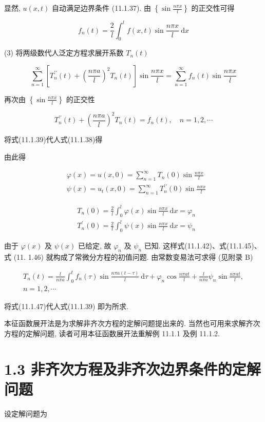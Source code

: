 显然, $u(x, t)$ 自动满足边界条件 (11.1.37). 由 $\left\{\sin \frac{n \pi x}{l}\right\}$ 的正交性可得

$$
f_{n}(t)=\frac{2}{l} \int_{0}^{l} f(x, t) \sin \frac{n \pi x}{l} \mathrm{~d} x
$$

(3) 将两级数代人泛定方程求展开系数 $T_{n}(t)$

$$
\sum_{n=1}^{\infty}\left[T_{n}^{\prime \prime}(t)+\left(\frac{n \pi a}{l}\right)^{2} T_{n}(t)\right] \sin \frac{n \pi x}{l}=\sum_{n=1}^{\infty} f_{n}(t) \sin \frac{n \pi x}{l}
$$

再次由 $\left\{\sin \frac{n \pi x}{l}\right\}$ 的正交性

$$
T_{n}^{\prime \prime}(t)+\left(\frac{n \pi a}{l}\right)^{2} T_{n}(t)=f_{n}(t), \quad n=1,2, \cdots
$$

将式(11.1.39)代人式(11.1.38)得

由此得

$$
\begin{aligned}
& \varphi(x)=u(x, 0)=\sum_{n=1}^{\infty} T_{n}(0) \sin \frac{n \pi x}{l} \\
& \psi(x)=u_{t}(x, 0)=\sum_{n=1}^{\infty} T_{n}^{\prime \prime}(0) \sin \frac{n \pi x}{l}
\end{aligned}
$$

$$
\begin{aligned}
& T_{n}(0)=\frac{2}{l} \int_{0}^{l} \varphi(x) \sin \frac{n \pi x}{l} \mathrm{~d} x=\varphi_{n} \\
& T_{n}^{\prime}(0)=\frac{2}{l} \int_{0}^{l} \psi(x) \sin \frac{n \pi x}{l} \mathrm{~d} x=\psi_{n}
\end{aligned}
$$

由于 $\varphi(x)$ 及 $\psi(x)$ 已给定, 故 $\varphi_{n}$ 及 $\psi_{n}$ 已知. 这样式(11.1.42)、式(11.1.45)、式 (11. 1.46) 就构成了常微分方程的初值问题. 由常数变易法可求得 (见附录 B)

$$
\begin{gathered}
T_{n}(t)=\frac{l}{n \pi a} \int_{0}^{t} f_{n}(\tau) \sin \frac{n \pi a(t-\tau)}{l} \mathrm{~d} \tau+\varphi_{n} \cos \frac{n \pi a t}{l}+\frac{l}{n \pi a} \psi_{n} \sin \frac{n \pi a t}{l}, \\
n=1,2, \cdots
\end{gathered}
$$

将式(11.1.47)代人式(11.1.39) 即为所求.

本征函数展开法是为求解非齐次方程的定解问题提出来的. 当然也可用来求解齐次方程的定解问题, 读者可用本征函数展开法重解例 11.1.1 及例 11.1.2.

\section{1.3 非齐次方程及非齐次边界条件的定解问题}
设定解问题为

